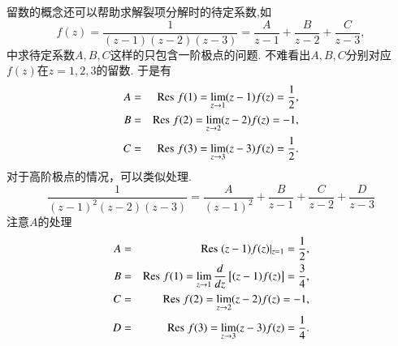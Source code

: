 留数的概念还可以帮助求解裂项分解时的待定系数,如
$$
    f(z) = \frac{1}{(z-1)(z-2)(z-3)} = \frac{A}{z-1} + \frac{B}{z-2} + \frac{C}{z-3},
$$
中求待定系数$A,B,C$这样的只包含一阶极点的问题. 不难看出$A,B,C$分别对应$f(z)$在$z=1,2,3$的留数.
于是有
\begin{eqnarray*}
    A &=& {\mathrm{Res}\;} f(1) = \lim_{z\to 1} (z-1) f(z) = {\frac{1}{2}},
    \\
    B &=& {\mathrm{Res}\;} f(2) = \lim_{z\to 2} (z-2) f(z) = -1,
    \\
    C &=& {\mathrm{Res}\;} f(3) = \lim_{z\to 3} (z-3) f(z) = {\frac{1}{2}}.
\end{eqnarray*}
对于高阶极点的情况，可以类似处理.
$$
\frac{1}{(z-1)^2(z-2)(z-3)}=\frac{A}{(z-1)^2}+\frac{B}{z-1}+\frac{C}{z-2}+\frac{D}{z-3}
$$
注意$A$的处理
\begin{eqnarray*}
    A &=& {\mathrm{Res}\;}  (z-1) f(z) |_{z=1}  = {\frac{1}{2}},
    \\
    B &=& {\mathrm{Res}\;} f(1) =  \lim_{z\to 1} \frac{d}{dz} \left[ (z-1) f(z) \right] = \frac{3}{4},
    \\
    C &=& {\mathrm{Res}\;} f(2) = \lim_{z\to 2} (z-2) f(z) = -1,
    \\
    D &=& {\mathrm{Res}\;} f(3) = \lim_{z\to 3} (z-3) f(z) = \frac{1}{4}.
\end{eqnarray*}
